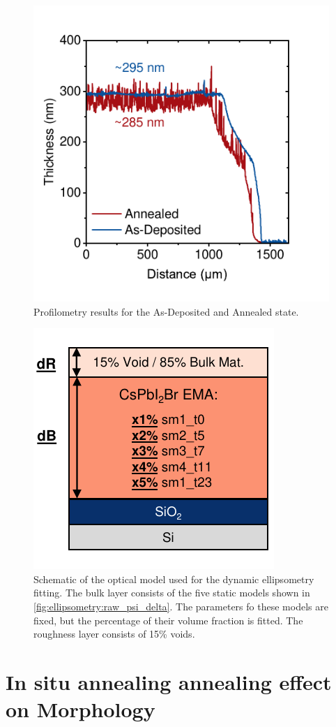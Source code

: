 




\begin{figure}
  \centering
  \medskip
  \includegraphics[width=.5\textwidth]{chapters/ellipsometry/image/Dektak.pdf}
  \caption{Profilometry results for the As-Deposited and Annealed state.}
  \label{fig:ellipsometry:profilometry}
\end{figure}



\begin{figure}
  \centering
  \medskip
  \includegraphics[width=.45\textwidth]{chapters/ellipsometry/image/Dynamic_Model.pdf}
  \caption{Schematic of the optical model used for the dynamic ellipsometry fitting. The bulk layer consists of the five static models shown in \ref{fig:ellipsometry:raw_psi_delta}. The parameters fo these models are fixed, but the percentage of their volume fraction is fitted. The roughness layer consists of 15\% voids.}
  \label{fig:ellipsometry:dynamic_model}
\end{figure}



\section{In situ annealing annealing effect on Morphology}

